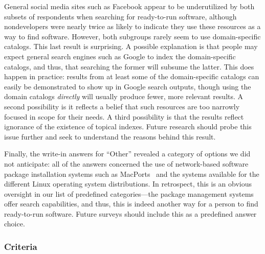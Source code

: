\documentclass{casicswhitepaper}
\begin{document}
General social media sites such as Facebook appear to be underutilized by both subsets of respondents when searching for ready-to-run software, although nondevelopers were nearly twice as likely to indicate they use these resources as a way to find software.  However, both subgroups rarely seem to use domain-specific catalogs.  This last result is surprising.  A possible explanation is that people may expect general search engines such as Google to index the domain-specific catalogs, and thus, that searching the former will subsume the latter.  This does happen in practice: results from at least some of the domain-specific catalogs can easily be demonstrated to show up in Google search outputs, though using the domain catalogs \emph{directly} will usually produce fewer, more relevant results.  A second possibility is it reflects a belief that such resources are too narrowly focused in scope for their needs.  A third possibility is that the results reflect ignorance of the existence of topical indexes.  Future research should probe this issue further and seek to understand the reasons behind this result.

Finally, the write-in answers for ``Other'' revealed a category of options we did not anticipate: all of the answers concerned the use of network-based software package installation systems such as MacPorts~\cite{fuller2002macports} and the systems available for the different Linux operating system distributions.  In retrospect, this is an obvious oversight in our list of predefined categories---the package management systems offer search capabilities, and thus, this is indeed another way for a person to find ready-to-run software.  Future surveys should include this as a predefined answer choice.


\subsubsection{Criteria}
\label{criteria-ready-to-use}
\end{document}
